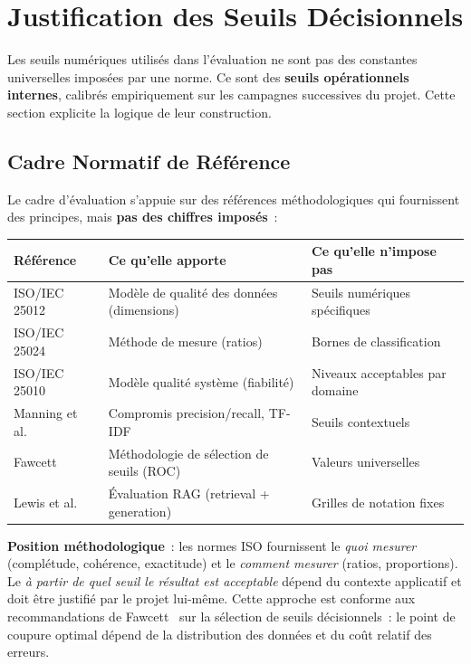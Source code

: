 \section{Justification des Seuils Décisionnels}
\label{sec:justification_seuils}

Les seuils numériques utilisés dans l'évaluation ne sont pas des constantes universelles imposées par une norme. Ce sont des \textbf{seuils opérationnels internes}, calibrés empiriquement sur les campagnes successives du projet. Cette section explicite la logique de leur construction.

\subsection{Cadre Normatif de Référence}
\label{sec:normes_references}

Le cadre d'évaluation s'appuie sur des références méthodologiques qui fournissent des principes, mais \textbf{pas des chiffres imposés}~:

\begin{longtable}{p{4cm}p{4cm}p{5cm}}
\toprule
\textbf{Référence} & \textbf{Ce qu'elle apporte} & \textbf{Ce qu'elle n'impose pas} \\
\midrule
ISO/IEC 25012~\cite{iso25012} & Modèle de qualité des données (dimensions) & Seuils numériques spécifiques \\
ISO/IEC 25024~\cite{iso25024} & Méthode de mesure (ratios) & Bornes de classification \\
ISO/IEC 25010~\cite{iso25010} & Modèle qualité système (fiabilité) & Niveaux acceptables par domaine \\
Manning et al.~\cite{manning2008ir} & Compromis precision/recall, TF-IDF & Seuils contextuels \\
Fawcett~\cite{fawcett2006roc} & Méthodologie de sélection de seuils (ROC) & Valeurs universelles \\
Lewis et al.~\cite{lewis2020rag} & Évaluation RAG (retrieval + generation) & Grilles de notation fixes \\
\bottomrule
\end{longtable}

\textbf{Position méthodologique}~: les normes ISO fournissent le \textit{quoi mesurer} (complétude, cohérence, exactitude) et le \textit{comment mesurer} (ratios, proportions). Le \textit{à partir de quel seuil le résultat est acceptable} dépend du contexte applicatif et doit être justifié par le projet lui-même. Cette approche est conforme aux recommandations de Fawcett~\cite{fawcett2006roc} sur la sélection de seuils décisionnels~: le point de coupure optimal dépend de la distribution des données et du coût relatif des erreurs.


